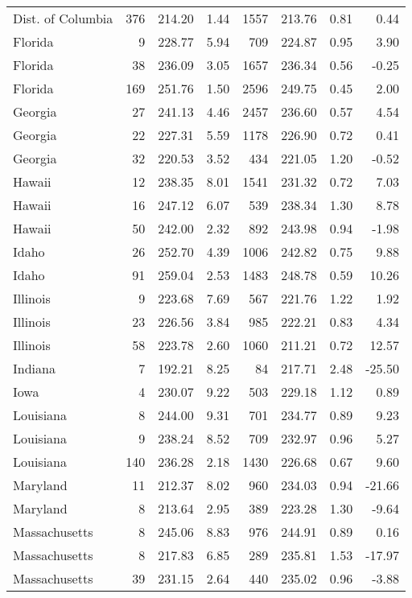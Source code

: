 \begin{longtable}{lrrr@{\extracolsep{10pt}}rrrr}
  Dist. of Columbia & 376 & 214.20 & 1.44 & 1557 & 213.76 & 0.81 & 0.44 \\ 
  Florida &   9 & 228.77 & 5.94 & 709 & 224.87 & 0.95 & 3.90 \\ 
  Florida &  38 & 236.09 & 3.05 & 1657 & 236.34 & 0.56 & -0.25 \\ 
  Florida & 169 & 251.76 & 1.50 & 2596 & 249.75 & 0.45 & 2.00 \\ 
  Georgia &  27 & 241.13 & 4.46 & 2457 & 236.60 & 0.57 & 4.54 \\ 
  Georgia &  22 & 227.31 & 5.59 & 1178 & 226.90 & 0.72 & 0.41 \\ 
  Georgia &  32 & 220.53 & 3.52 & 434 & 221.05 & 1.20 & -0.52 \\ 
  Hawaii &  12 & 238.35 & 8.01 & 1541 & 231.32 & 0.72 & 7.03 \\ 
  Hawaii &  16 & 247.12 & 6.07 & 539 & 238.34 & 1.30 & 8.78 \\ 
  Hawaii &  50 & 242.00 & 2.32 & 892 & 243.98 & 0.94 & -1.98 \\ 
  Idaho &  26 & 252.70 & 4.39 & 1006 & 242.82 & 0.75 & 9.88 \\ 
  Idaho &  91 & 259.04 & 2.53 & 1483 & 248.78 & 0.59 & 10.26 \\ 
  Illinois &   9 & 223.68 & 7.69 & 567 & 221.76 & 1.22 & 1.92 \\ 
  Illinois &  23 & 226.56 & 3.84 & 985 & 222.21 & 0.83 & 4.34 \\ 
  Illinois &  58 & 223.78 & 2.60 & 1060 & 211.21 & 0.72 & 12.57 \\ 
  Indiana &   7 & 192.21 & 8.25 &  84 & 217.71 & 2.48 & -25.50 \\ 
  Iowa &   4 & 230.07 & 9.22 & 503 & 229.18 & 1.12 & 0.89 \\ 
  Louisiana &   8 & 244.00 & 9.31 & 701 & 234.77 & 0.89 & 9.23 \\ 
  Louisiana &   9 & 238.24 & 8.52 & 709 & 232.97 & 0.96 & 5.27 \\ 
  Louisiana & 140 & 236.28 & 2.18 & 1430 & 226.68 & 0.67 & 9.60 \\ 
  Maryland &  11 & 212.37 & 8.02 & 960 & 234.03 & 0.94 & -21.66 \\ 
  Maryland &   8 & 213.64 & 2.95 & 389 & 223.28 & 1.30 & -9.64 \\ 
  Massachusetts &   8 & 245.06 & 8.83 & 976 & 244.91 & 0.89 & 0.16 \\ 
  Massachusetts &   8 & 217.83 & 6.85 & 289 & 235.81 & 1.53 & -17.97 \\ 
  Massachusetts &  39 & 231.15 & 2.64 & 440 & 235.02 & 0.96 & -3.88 \\ 

\end{longtable}
